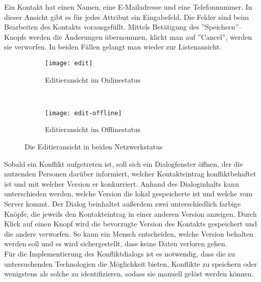 Ein Kontakt hat einen Namen, eine E-Mailadresse und eine Telefonnummer. In dieser Ansicht gibt es für jedes Attribut ein Eingabefeld. Die Felder sind beim Bearbeiten des Kontakts vorausgefüllt. Mittels Betätigung des ''Speichern''--Knopfs werden die Änderungen übernommen, klickt man auf ''Cancel'', werden sie verworfen. In beiden Fällen gelangt man wieder zur Listenansicht.
\begin{figure}[H]
  \centering
  \begin{subfigure}[t]{0.49\textwidth}
          \texttt{[image: edit]}
          \caption{Editieransicht im Onlinestatus}
          \label{fig:edit-online}
  \end{subfigure}
  ~ 
  \begin{subfigure}[t]{0.49\textwidth}
          \texttt{[image: edit-offline]}
          \caption{Editieransicht im Offlinestatus}
          \label{fig:edit-offline}
  \end{subfigure}
  \grayRule
  \caption{Die Editieransicht in beiden Netzwerkstatus}
  \label{fig:edit}
\end{figure}
Sobald ein Konflikt aufgetreten ist, soll sich ein Dialogfenster öffnen, der die nutzenden Personen darüber informiert, welcher Kontakteintrag konfliktbehaftet ist und mit welcher Version er konkurriert.
Anhand des Dialoginhalts kann unterschieden werden, welche Version die lokal gespeicherte ist und welche vom Server kommt.
Der Dialog beinhaltet außerdem zwei unterschiedlich farbige Knöpfe, die jeweils den Kontakteintrag in einer anderen Version anzeigen.
Durch Klick auf einen Knopf wird die bevorzugte Version des Kontakts gespeichert und die andere verworfen.
So kann ein Mensch entscheiden, welche Version behalten werden soll und es wird sichergestellt, dass keine Daten verloren gehen.\\
Für die Implementierung des Konfliktdialogs ist es notwendig, dass die zu untersuchenden Technologien die Möglichkeit bieten, Konflikte zu speichern oder wenigstens als solche zu identifizieren, sodass sie manuell gelöst werden können.